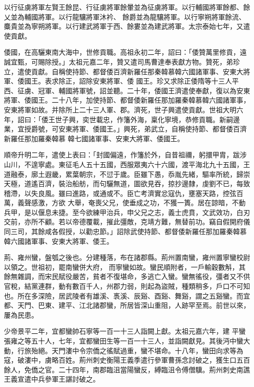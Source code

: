 \begin{pinyinscope}
 以行征虜將軍左賢王餘昆、行征虜將軍餘暈並為征虜將軍。以行輔國將軍餘都、餘乂並為輔國將軍。以行龍驤將軍沐衿、
 餘爵並為龍驤將軍。以行寧朔將軍餘流、麋貴並為寧朔將軍。以行建武將軍于西、餘婁並為建武將軍。太宗泰始七年，又遣使貢獻。



 倭國，在高驪東南大海中，世修貢職。高祖永初二年，詔曰：「倭贊萬里修貢，遠誠宜甄，可賜除授。」太祖元嘉二年，贊又遣司馬曹達奉表獻方物。贊死，弟珍立，遣使貢獻。自稱使持節、都督倭百濟新羅任那秦韓慕韓六國諸軍事、安東大將軍、倭國王。表求除正，詔除安東將軍、倭
 國王。珍又求除正倭隋等十三人平西、征虜、冠軍、輔國將軍號，詔並聽。二十年，倭國王濟遣使奉獻，復以為安東將軍、倭國王。二十八年，加使持節、都督倭新羅任那加羅秦韓慕韓六國諸軍事，安東將軍如故。并除所上二十三人軍、郡。濟死，世子興遣使貢獻。世祖大明六年，詔曰：「倭王世子興，奕世載忠，作籓外海，稟化寧境，恭修貢職。新嗣邊業，宜授爵號，可安東將軍、倭國王。」興死，弟武立，自稱使持節、都督倭百濟新羅任那加羅秦韓慕
 韓七國諸軍事、安東大將軍、倭國王。



 順帝升明二年，遣使上表曰：「封國偏遠，作籓於外，自昔祖禰，躬擐甲胄，跋涉山川，不遑寧處。東征毛人五十五國，西服眾夷六十六國，渡平海北九十五國，王道融泰，廓土遐畿，累葉朝宗，不愆于歲。臣雖下愚，忝胤先緒，驅率所統，歸崇天極，道遙百濟，裝治船舫，而句驪無道，圖欲見吞，掠抄邊隸，虔劉不已，每致稽滯，以失良風。雖曰進路，或通或不。臣亡考濟實忿寇仇，壅塞天路，控弦百萬，義聲感激，方欲
 大舉，奄喪父兄，使垂成之功，不獲一簣。居在諒暗，不動兵甲，是以偃息未捷。至今欲練甲治兵，申父兄之志，義士虎賁，文武效功，白刃交前，亦所不顧。若以帝德覆載，摧此彊敵，克靖方難，無替前功。竊自假開府儀同三司，其餘咸各假授，以勸忠節。」詔除武使持節、都督倭新羅任那加羅秦韓慕韓六國諸軍事、安東大將軍、倭王。



 荊、雍州蠻，盤瓠之後也。分建種落，布在諸郡縣。荊州置南蠻，雍州置寧蠻校尉以領之。世祖初，罷南蠻併大府，
 而寧蠻如故。蠻民順附者，一戶輸穀數斛，其餘無雜調，而宋民賦役嚴苦，貧者不復堪命，多逃亡入蠻。蠻無徭役，彊者又不供官稅，結黨連群，動有數百千人，州郡力弱，則起為盜賊，種類稍多，戶口不可知也。所在多深險，居武陵者有雄溪、褭溪、辰谿、酉谿、舞谿，謂之五谿蠻。而宜都、天門、巴東、建平、江北諸郡蠻，所居皆深山重阻，人跡罕至焉。前世以來，屢為民患。



 少帝景平二年，宜都蠻帥石寧等一百一十三人詣闕上獻。太祖元嘉六年，建
 平蠻張雍之等五十人，七年，宜都蠻田生等一百一十三人，並詣闕獻見。其後沔中蠻大動，行旅殆絕。天門漊中令宗僑之徭賦過重，蠻不堪命。十八年，蠻田向求等為寇，破漊中，虜略百姓。荊州刺史衡陽王義季遣行參軍曹孫念討破之，獲生口五百餘人，免僑之官。二十四年，南郡臨沮當陽蠻反，縛臨沮令傅僧驥。荊州刺史南譙王義宣遣中兵參軍王諶討破之。




\end{pinyinscope}
